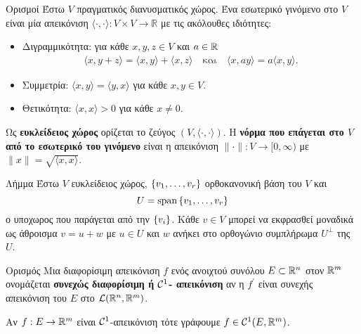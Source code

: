 \begin{nameddefn}{Ορισμοί} Έστω $V$ πραγματικός διανυσματικός χώρος. Ένα 
    εσωτερικό γινόμενο στο $V$ είναι μία απεικόνιση $\langle\cdot,\cdot\rangle:
    V\times V \rightarrow \mathbb{R}$ με τις ακόλουθες ιδιότητες:
    \begin{itemize}
        \item Διγραμμικότητα: για κάθε $x, y, z \in V$ και $a \in \mathbb{R}$
            \begin{gather*}
                \langle x, y+z \rangle = \langle x, y \rangle + \langle x, z 
                \rangle \quad \text{και} \quad \langle x, ay \rangle = 
                a\langle x, y \rangle.   
            \end{gather*}
        \item Συμμετρία: $\langle x, y \rangle = \langle y, x \rangle$ για κάθε 
            $x, y \in V$.
        \item Θετικότητα: $\langle x, x \rangle > 0$ για κάθε $x \neq 0$.
    \end{itemize}

    Ως \textbf{ευκλείδειος χώρος} ορίζεται το ζεύγος $\left(V, 
    \langle\cdot,\cdot\rangle\right)$. Η \textbf{νόρμα που επάγεται στο $V$ από
    το εσωτερικό του γινόμενο} είναι η απεικόνιση $\|\cdot\|:V\rightarrow 
    [0, \infty)$ με $\|x\| = \sqrt{\langle x, x \rangle}$.
\end{nameddefn}
\begin{nameddefn}{Λήμμα}
    Έστω $V$ ευκλείδειος χώρος, $\set{v_1, \ldots, v_r}$ ορθοκανονική βάση του 
    $V$ και \[U= \vspan \set{v_1, \ldots, v_r}\] ο υποχωρος που παράγεται από 
    την $\set{v_i}$. Κάθε $v \in V$ μπορεί να εκφρασθεί μοναδικά ως άθροισμα 
    $v = u + w$ με $u \in U$ και $w$ ανήκει στο ορθογώνιο συμπλήρωμα $U^{\perp}$
    της $U$. \cite{Jnich1994}
    \label{lemma_sum}
\end{nameddefn}
\begin{nameddefn}{Ορισμός}
    Μια διαφορίσιμη απεικόνιση $f$ ενός ανοιχτού συνόλου $E \subset \mathbb{R}^{n}$ 
    στον $\mathbb{R}^{m}$ ονομάζεται \textbf{συνεχώς διαφορίσιμη ή $\mathcal{C}^{1}$-
    απεικόνιση} αν η $f^{\prime}$ είναι συνεχής απεικόνιση του $E$ στο 
    $\mathcal{L}(\mathbb{R}^{n}, \mathbb{R}^{m})$.

    Αν $f: E \to \mathbb{R}^{m}$ είναι $\mathcal{C}^{1}$-απεικόνιση τότε γράφουμε $f \in 
    \mathcal{C}^{1}(E, \mathbb{R}^{m})$.
\end{nameddefn}
